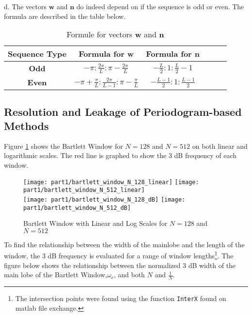 \noindent{}d. The vectors $\textbf{w}$ and $\textbf{n}$ do indeed depend on if the sequence is odd or even. The formula are described in the table below.

\begin{table}[H]
  \centering
    \begin{tabular}{|c|c|c|c|c|c|}
        \hline
        \textbf{Sequence Type} & \textbf{Formula for $\textbf{w}$} & \textbf{Formula for $\textbf{n}$} \\
        \hline
        \textbf{Odd} & $-\pi:\frac{2\pi}{L}:\pi-\frac{2\pi}{L}$ & $-\frac{L}{2}:1:\frac{L}{2}-1$ \\
        \hline
        \textbf{Even} & $-\pi+\frac{\pi}{L}:\frac{2\pi}{L-1}:\pi-\frac{\pi}{L}$ & $-\frac{L-1}{2}:1:\frac{L-1}{2}$ \\
        \hline
    \end{tabular}%
  \caption{Formule for vectors $\textbf{w}$ and $\textbf{n}$}
\end{table}%


\subsection{Resolution and Leakage of Periodogram-based Methods}


\noindent{}Figure \ref{fig:bartlett_window_log_linear} shows the Bartlett Window for $N=128$ and $N=512$ on both linear and logarithmic scales. The red line is graphed to show the 3 dB frequency of each window. 

\begin{figure}[H]
\centering{}
\texttt{[image: part1/bartlett\_window\_N\_128\_linear]}
\texttt{[image: part1/bartlett\_window\_N\_512\_linear]} \\
\texttt{[image: part1/bartlett\_window\_N\_128\_dB]}
\texttt{[image: part1/bartlett\_window\_N\_512\_dB]}
\caption{Bartlett Window with Linear and Log Scales for $N=128$ and $N=512$}
\label{fig:bartlett_window_log_linear}
\end{figure}

\noindent{}To find the relationship between the width of the mainlobe and the length of the window, the 3 dB frequency is evaluated for a range of window lengths\footnote{The intersection points were found using the function \texttt{InterX} found on matlab file exchange.}. The figure below shows the relationship between the normalized 3 dB width of the main lobe of the Bartlett Window,$\omega_{c}$, and both $N$ and $\frac{1}{N}$. 

